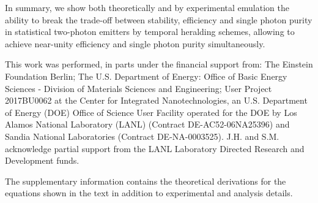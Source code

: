 \documentclass[journal=nalefd,manuscript=letter]{achemso}
\begin{document}
In summary, we show both theoretically and by experimental emulation the ability to break the trade-off between stability, efficiency and single photon purity in statistical two-photon emitters by temporal heralding schemes, allowing to achieve near-unity efficiency and single photon purity simultaneously.

\begin{acknowledgement}
This work was performed, in parts under the financial support from: The Einstein Foundation Berlin; The U.S. Department of Energy: Office of Basic Energy Sciences - Division of Materials Sciences and Engineering; User Project 2017BU0062 at the Center for Integrated Nanotechnologies, an U.S. Department of Energy (DOE) Office of Science User Facility operated for the DOE by Los Alamos National Laboratory (LANL) (Contract DE-AC52-06NA25396) and Sandia National Laboratories (Contract DE-NA-0003525). J.H. and S.M. acknowledge partial support from the LANL Laboratory Directed Research and Development funds.

\end{acknowledgement}

\begin{suppinfo}


The supplementary information contains the theoretical derivations for the equations shown in the text in addition to experimental and analysis details.%

\end{suppinfo}

\end{document}

